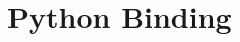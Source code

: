 \documentclass{beamer}
\begin{document}
\frame[plain]{\titlepage}
\section{Python Binding}









\end{document}
